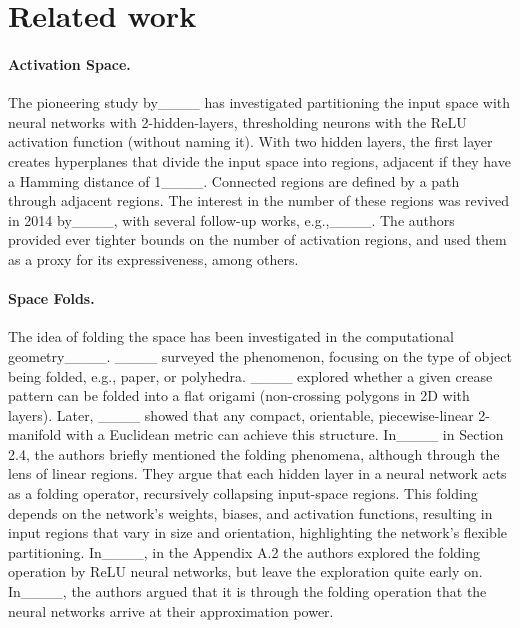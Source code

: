 \section{Related work}
\label{sec:related_work}


\paragraph{Activation Space.}
The pioneering study by____ has investigated  partitioning the input space with neural networks with 2-hidden-layers,  thresholding neurons with the ReLU activation function (without naming it). 
With two hidden layers, the first layer creates hyperplanes that divide the input space into regions, adjacent if they have a Hamming distance of 1____. Connected regions are defined by a path through adjacent regions.  The interest in the number of these regions was revived in 2014 by____, with several follow-up works, e.g.,____. The authors provided ever tighter  bounds on the number of activation regions, and  used them as a proxy for its expressiveness, among others.  


\paragraph{Space Folds.} The idea of  folding the space has been investigated in the computational geometry____.
____ surveyed the phenomenon, focusing on the type of object being folded, e.g., paper, or polyhedra.
____ explored whether a given crease pattern can be folded into a flat origami (non-crossing polygons in 2D with layers). Later, ____ showed that any compact, orientable, piecewise-linear 2-manifold with a Euclidean metric can achieve this structure.
In____ in Section 2.4, the authors briefly mentioned the folding phenomena, although through the lens of  linear regions. They argue that each hidden layer in a neural network acts as a folding operator, recursively collapsing input-space regions. This folding depends on the network's weights, biases, and activation functions, resulting in input regions that vary in size and orientation, highlighting the network's flexible partitioning. 
In____, in the Appendix A.2 the authors explored the folding operation by ReLU neural networks, but leave the exploration quite early on.  In____, the authors argued that it is through the folding operation that the neural networks arrive at their approximation power. 

